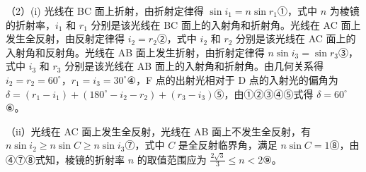 \documentclass[\gkver]{gaokaozhenti}
\begin{document}
\begin{enumerate}
{（2）(i) 光线在 BC 面上折射，由折射定律得 $\sin i_{1}=n\sin r_{1}$①，式中 $n$ 为棱镜的折射率，$i_{1}$ 和 $r_{1}$ 分别是该光线在 BC 面上的入射角和折射角。光线在 AC 面上发生全反射，由反射定律得 $i_{2}=r_{2}$②，式中 $i_{2}$ 和 $r_{2}$ 分别是该光线在 AC 面上的入射角和反射角。光线在 AB 面上发生折射，由折射定律得 $n\sin i_{3}=\sin r_{3}$③，式中 $i_{3}$ 和 $r_{3}$ 分别是该光线在 AB 面上的入射角和折射角。由几何关系得 $i_{2}=r_{2}=60^{\circ}$，$r_{1}=i_{3}=30^{\circ}$④，F 点的出射光相对于 D 点的入射光的偏角为 $\delta=(r_{1}-i_{1})+(180^{\circ}-i_{2}-r_{2})+(r_{3}-i_{3})$⑤，由①②③④⑤式得 $\delta=60^{\circ}$⑥。

（ii）光线在 AC 面上发生全反射，光线在 AB 面上不发生全反射，有 $n\sin i_{2}\geq n\sin C\geq n\sin i_{3}$⑦，式中 $C$ 是全反射临界角，满足 $n\sin C=1$⑧，由④⑦⑧式知，棱镜的折射率 $n$ 的取值范围应为 $\frac{2\sqrt{3}}{3}\leq n<2$⑨。

}

\end{enumerate}
\end{document}
